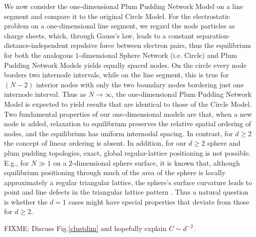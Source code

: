 \documentclass[aps,pre,manuscript,superscriptaddress,amsmath,amssymb,nofootinbib]{revtex4-1}
\begin{document}
We now consider the one-dimensional Plum Pudding Network Model on a line segment and compare it to the original Circle Model.
For the electrostatic problem on a one-dimensional line segment, we regard the node particles as charge sheets, which, through Gauss's law, leads to a constant separation-distance-independent repulsive force between electron pairs, thus the equilibrium for both the analogous $1$-dimensional Sphere Network (i.e. Circle) and Plum Pudding Network Models yields equally spaced nodes. 
On the circle every node borders two internode intervals, while on the line segment, this is true for $(N-2)$ interior nodes with only the two boundary nodes bordering just one internode interval.
Thus as $N \to \infty$, the one-dimensional Plum Pudding Network Model is expected to yield results that are identical to those of the Circle Model.
Two fundamental properties of our one-dimensional models are that, when a new node is added, relaxation to equilibrium preserves the relative spatial ordering of nodes, and the equilibrium has uniform internodal spacing.
In contrast, for $d \geq 2$ the concept of linear ordering is absent.
In addition, for our $d \geq 2$ sphere and plum pudding topologies, exact, global regular-lattice positioning is not possible.
E.g., for $N \gg 1$ on a $2$-dimensional sphere surface, it is known that, although equilibrium positioning through much of the area of the sphere is locally approximately a regular triangular lattice, the sphere's surface curvature leads to point and line defects in the triangular lattice pattern \cite{nelson}.
Thus a natural question is whether the $d = 1$ cases might have special properties that deviate from those for $d \geq 2$.

FIXME: Discuss Fig.\ref{clustdim} and hopefully explain $C \sim d^{-2}$.
\end{document}
